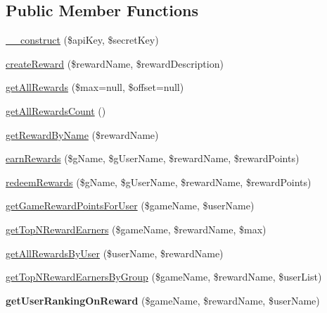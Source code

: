 \subsection*{Public Member Functions}
\begin{DoxyCompactItemize}
\item 
\hyperlink{class_reward_service_a49f2ad222e06420736d750e167d55d7c}{\+\_\+\+\_\+construct} (\$api\+Key, \$secret\+Key)
\item 
\hyperlink{class_reward_service_adaae9222a809b47b1d432feac8bf33db}{create\+Reward} (\$reward\+Name, \$reward\+Description)
\item 
\hyperlink{class_reward_service_a9173ee094fe8870c9154ef55e595f8bf}{get\+All\+Rewards} (\$max=null, \$offset=null)
\item 
\hyperlink{class_reward_service_aea4556c3f68abf9eaa5dd96ff81cf272}{get\+All\+Rewards\+Count} ()
\item 
\hyperlink{class_reward_service_a8dff31ca8db1193c327258f4f5679daa}{get\+Reward\+By\+Name} (\$reward\+Name)
\item 
\hyperlink{class_reward_service_a1d95761765e4d40eec732b126caa8248}{earn\+Rewards} (\$g\+Name, \$g\+User\+Name, \$reward\+Name, \$reward\+Points)
\item 
\hyperlink{class_reward_service_a7c3e1b2f0dd3e9b821bee809fc22eb4d}{redeem\+Rewards} (\$g\+Name, \$g\+User\+Name, \$reward\+Name, \$reward\+Points)
\item 
\hyperlink{class_reward_service_ab466352a5548a71dd1fdce6820cd99ff}{get\+Game\+Reward\+Points\+For\+User} (\$game\+Name, \$user\+Name)
\item 
\hyperlink{class_reward_service_a2acd37372c5da9fce742099657e0c52a}{get\+Top\+N\+Reward\+Earners} (\$game\+Name, \$reward\+Name, \$max)
\item 
\hyperlink{class_reward_service_a41d478f2d997aeab0aadf3746718cc27}{get\+All\+Rewards\+By\+User} (\$user\+Name, \$reward\+Name)
\item 
\hyperlink{class_reward_service_a817c6cfccefe9d8e117e94752fd5f0ec}{get\+Top\+N\+Reward\+Earners\+By\+Group} (\$game\+Name, \$reward\+Name, \$user\+List)
\item 
\hypertarget{class_reward_service_a2c0374dad1c4ba515ca0fea25be1d544}{{\bfseries get\+User\+Ranking\+On\+Reward} (\$game\+Name, \$reward\+Name, \$user\+Name)}\label{class_reward_service_a2c0374dad1c4ba515ca0fea25be1d544}

\end{DoxyCompactItemize}

